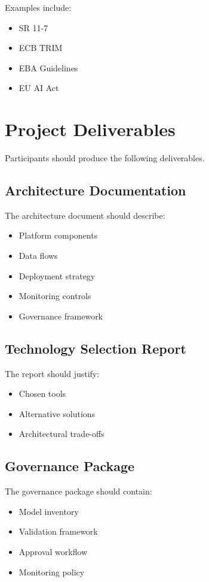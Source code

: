 Examples include:

\begin{itemize}
    \item SR 11-7
    \item ECB TRIM
    \item EBA Guidelines
    \item EU AI Act
\end{itemize}

\section{Project Deliverables}

Participants should produce the following deliverables.

\subsection{Architecture Documentation}

The architecture document should describe:

\begin{itemize}
    \item Platform components
    \item Data flows
    \item Deployment strategy
    \item Monitoring controls
    \item Governance framework
\end{itemize}

\subsection{Technology Selection Report}

The report should justify:

\begin{itemize}
    \item Chosen tools
    \item Alternative solutions
    \item Architectural trade-offs
\end{itemize}

\subsection{Governance Package}

The governance package should contain:

\begin{itemize}
    \item Model inventory
    \item Validation framework
    \item Approval workflow
    \item Monitoring policy
\end{itemize}

